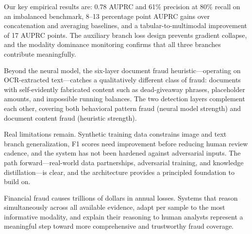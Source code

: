 \documentclass[10pt,conference,letterpaper]{IEEEtran}
\begin{document}
Our key empirical results are: 0.78 AUPRC and 61\% precision at 80\% recall on an
imbalanced benchmark, 8--13 percentage point AUPRC gains over concatenation and
averaging baselines, and a tabular-to-multimodal improvement of 17 AUPRC points. The
auxiliary branch loss design prevents gradient collapse, and the modality dominance
monitoring confirms that all three branches contribute meaningfully.

Beyond the neural model, the six-layer document fraud heuristic---operating on
OCR-extracted text---catches a qualitatively different class of fraud: documents with
self-evidently fabricated content such as dead-giveaway phrases, placeholder amounts,
and impossible running balances. The two detection layers complement each other,
covering both behavioral pattern fraud (neural model strength) and document content
fraud (heuristic strength).

Real limitations remain. Synthetic training data constrains image and text branch
generalization, F1 scores need improvement before reducing human review cadence, and the
system has not been hardened against adversarial inputs. The path forward---real-world
data partnerships, adversarial training, and knowledge distillation---is clear, and the
architecture provides a principled foundation to build on.

Financial fraud causes trillions of dollars in annual losses. Systems that reason
simultaneously across all available evidence, adapt per sample to the most informative
modality, and explain their reasoning to human analysts represent a meaningful step
toward more comprehensive and trustworthy fraud coverage.



\end{document}

